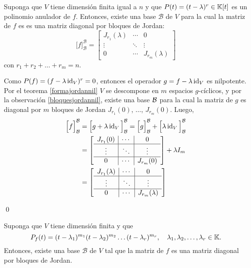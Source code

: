 \begin{lema}
Suponga que $V$ tiene dimensi\'on finita igual a $n$ y que $P(t)=(t-\lambda)^r\in \mathbb{K}[t]$ es un polinomio anulador de $f$. Entonces, existe una base $\mathcal{B}$ de $V$ para la cual la matriz de $f$ es
es una matriz diagonal por bloques de Jordan:
\[
\Big[f\Big]^\mathcal{B}_\mathcal{B}=\left[\begin{array}{c|c|c}
J_{r_1}(\lambda) & \cdots & 0\\
\hline
\vdots & \ddots & \vdots\\
\hline
0 & \cdots & J_{r_m}(\lambda)
\end{array}\right] 
\]
con $r_1+r_2+\ldots+r_m=n$.
\end{lema}

\dem Como $P(f)=(f-\lambda\operatorname{id}_V)^r=0$, entonces el operador $g=f-\lambda\operatorname{id}_V$ es nilpotente. Por el teorema \ref{formajordannil} $V$ se descompone en $m$ espacios $g$-cíclicos, y por la observación \ref{bloquesjordannil}, existe una base $\mathcal{B}$ para la cual la matriz de $g$ es diagonal por $m$ bloques de Jordan $J_{r_1}(0)$, $\ldots$, $J_{r_m}(0)$. Luego,
\begin{align*}
  \Big[f\Big]^\mathcal{B}_\mathcal{B} & = \Big[g+\lambda\operatorname{id}_V\Big]^\mathcal{B}_\mathcal{B}= \Big[g\Big]^\mathcal{B}_\mathcal{B}+\Big[\lambda\operatorname{id}_V\Big]^\mathcal{B}_\mathcal{B}\\
   & = \left[\begin{array}{c|c|c}
    J_{r_1}(0) & \cdots & 0\\
    \hline
    \vdots & \ddots & \vdots\\
    \hline
    0 & \cdots & J_{r_m}(0)
    \end{array}\right] + \lambda I_m \\
  & = \left[\begin{array}{c|c|c}
    J_{r_1}(\lambda) & \cdots & 0\\
    \hline
    \vdots & \ddots & \vdots\\
    \hline
    0 & \cdots & J_{r_m}(\lambda)
    \end{array}\right]
\end{align*}

\qed

\begin{teo}\label{teorema_de_jordan}
Suponga que $V$ tiene dimensi\'on finita y que
\[
P_f(t)=(t-\lambda_1)^{m_1}(t-\lambda_2)^{m_2}\ldots(t-\lambda_r)^{m_r}, \quad \lambda_1,\lambda_2,\ldots,\lambda_r\in \mathbb{K}.
\]
Entonces, existe una base $\mathcal{B}$ de $V$ tal que la matriz de $f$ es una matriz diagonal por bloques de Jordan. 
\end{teo}

